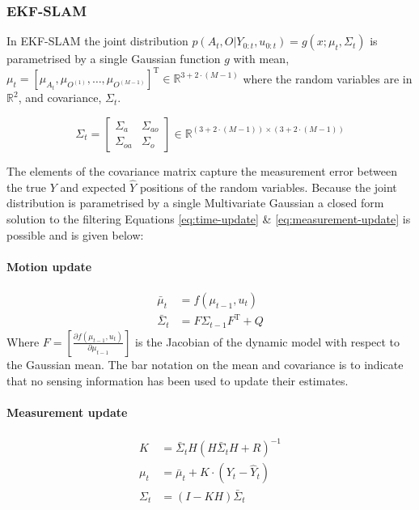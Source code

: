 \subsubsection{EKF-SLAM}\label{sec:EKF-SLAM}

In EKF-SLAM the joint distribution $p(A_{t},O|Y_{0:t},u_{0:t}) = g(x;\mu_t,\Sigma_t)$ is parametrised by a single Gaussian function $g$ with mean,
$\mu_t = \left[\mu_{A_{t}},\mu_{O^{(1)}},\dots,\mu_{O^{(M-1)}}\right]^{\mathrm{T}} \in \mathbb{R}^{3 + 2\cdot (M-1)}$  where the random variables 
are in $\mathbb{R}^2$, and covariance, $\Sigma_t$. 

\begin{equation}
\Sigma_t = \begin{bmatrix}
       \Sigma_a & \Sigma_{ao}  \\[0.3em]
       \Sigma_{oa} & \Sigma_o
     \end{bmatrix}
     \in \mathbb{R}^{(3 + 2\cdot (M-1)) \times (3 + 2\cdot (M-1))}
\end{equation}

The elements of the covariance matrix capture the measurement error between the true $Y$ and expected $\hat{Y}$ 
positions of the random variables. Because the joint distribution is parametrised by a single Multivariate Gaussian a closed 
form solution to the filtering Equations \ref{eq:time-update} \& \ref{eq:measurement-update} is possible and is given below:

\paragraph{Motion update}
\begin{align}
  \bar{\mu}_t      &= f(\mu_{t-1},u_t)\\
  \bar{\Sigma}_{t} &= F \Sigma_{t-1} F^{\mathrm{T}} + Q
\end{align}
Where $F = \left[\frac{\partial f(\mu_{t-1},u_t)}{\partial \mu_{t-1} } \right]$ is the Jacobian of the dynamic model with respect to the Gaussian mean. The 
bar notation on the mean and covariance is to indicate that no sensing information has been used to update their estimates.

\paragraph{Measurement update}

\begin{align}
   K    &= \bar{\Sigma}_{t} H (H \bar{\Sigma}_{t} H + R)^{-1} \\
  \mu_t &= \bar{\mu}_t + K \cdot (Y_t - \hat{Y}_t)\\
  \Sigma_t &= (I - KH) \bar{\Sigma}_{t}
\end{align}
 
